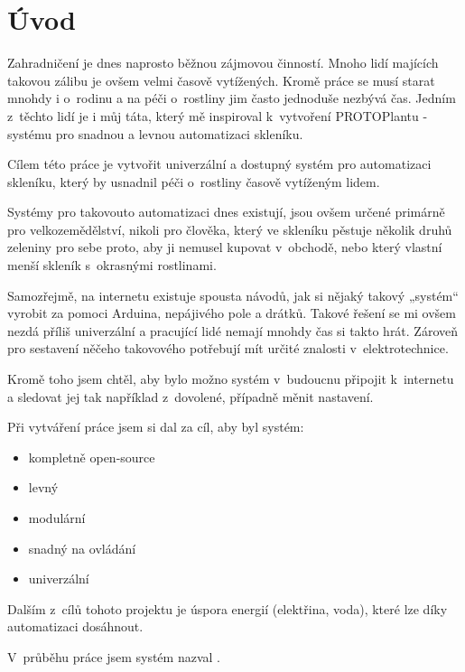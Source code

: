 \chapter*{Úvod}

Zahradničení je dnes naprosto běžnou zájmovou činností. Mnoho lidí majících takovou zálibu je ovšem velmi časově vytížených. Kromě práce se musí starat mnohdy i o~rodinu a na péči o~rostliny jim často jednoduše nezbývá čas. Jedním z~těchto lidí je i můj táta, který mě inspiroval k~vytvoření PROTOPlantu - systému pro snadnou a levnou automatizaci skleníku.

Cílem této práce je vytvořit univerzální a dostupný systém pro automatizaci skleníku, který by usnadnil péči o~rostliny časově vytíženým lidem. 

Systémy pro takovouto automatizaci dnes existují, jsou ovšem určené primárně pro velkozemědělství, nikoli pro člověka, který ve skleníku pěstuje několik druhů zeleniny pro sebe proto, aby ji nemusel kupovat v~obchodě, nebo který vlastní menší skleník s~okrasnými rostlinami. 

Samozřejmě, na internetu existuje spousta návodů, jak si nějaký takový „systém“ vyrobit za pomoci Arduina, nepájivého pole a  drátků.
Takové řešení se mi ovšem nezdá příliš univerzální a pracující lidé nemají mnohdy čas si takto hrát.
Zároveň pro sestavení něčeho takovového potřebují mít určité znalosti v~elektrotechnice.

Kromě toho jsem chtěl, aby bylo možno systém v~budoucnu připojit k~internetu a sledovat jej tak například z~dovolené, případně měnit nastavení.

Při vytváření práce jsem si dal za cíl, aby byl systém:
\begin{itemize}
    \item kompletně open-source
    \item levný
    \item modulární
    \item snadný na ovládání
    \item univerzální
\end{itemize}

Dalším z~cílů tohoto projektu je úspora energií (elektřina, voda), které lze díky automatizaci dosáhnout.

V~průběhu práce jsem systém nazval .

\newpage
